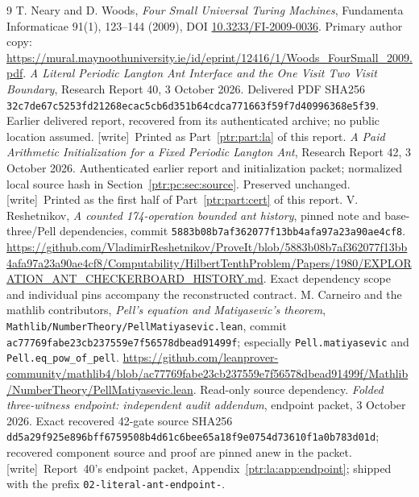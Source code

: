 \documentclass[11pt,letterpaper]{article}
\theoremstyle{definition}\newtheorem{definition}[theorem]{Definition}
\theoremstyle{remark}\newtheorem{remark}[theorem]{Remark}
\newcommand{\codeu}[1]{\nolinkurl{#1}}
\newcommand{\wtag}{\textup{[write]}}
\begin{document}
\begin{thebibliography}{9}
 T. Neary and D. Woods, \emph{Four Small Universal Turing Machines}, Fundamenta Informaticae 91(1), 123--144 (2009), DOI \href{https://doi.org/10.3233/FI-2009-0036}{10.3233/FI-2009-0036}. Primary author copy: \url{https://mural.maynoothuniversity.ie/id/eprint/12416/1/Woods_FourSmall_2009.pdf}.
 \emph{A Literal Periodic Langton Ant Interface and the One Visit Two Visit Boundary}, Research Report 40, 3 October 2026. Delivered PDF SHA256 \codeu{32c7de67c5253fd21268ecac5cb6d351b64cdca771663f59f7d40996368e5f39}. Earlier delivered report, recovered from its authenticated archive; no public location assumed. \wtag\ Printed as Part~\ref{ptr:part:la} of this report.
 \emph{A Paid Arithmetic Initialization for a Fixed Periodic Langton Ant}, Research Report 42, 3 October 2026. Authenticated earlier report and initialization packet; normalized local source hash in Section~\ref{ptr:pc:sec:source}. Preserved unchanged. \wtag\ Printed as the first half of Part~\ref{ptr:part:cert} of this report.
 V. Reshetnikov, \emph{A counted 174-operation bounded ant history}, pinned note and base-three/Pell dependencies, commit \codeu{5883b08b7af362077f13bb4afa97a23a90ae4cf8}. \url{https://github.com/VladimirReshetnikov/ProveIt/blob/5883b08b7af362077f13bb4afa97a23a90ae4cf8/Computability/HilbertTenthProblem/Papers/1980/EXPLORATION_ANT_CHECKERBOARD_HISTORY.md}. Exact dependency scope and individual pins accompany the reconstructed contract.
 M. Carneiro and the mathlib contributors, \emph{Pell's equation and Matiyasevic's theorem}, \codeu{Mathlib/NumberTheory/PellMatiyasevic.lean}, commit \codeu{ac77769fabe23cb237559e7f56578dbead91499f}; especially \codeu{Pell.matiyasevic} and \codeu{Pell.eq_pow_of_pell}. \url{https://github.com/leanprover-community/mathlib4/blob/ac77769fabe23cb237559e7f56578dbead91499f/Mathlib/NumberTheory/PellMatiyasevic.lean}. Read-only source dependency.
 \emph{Folded three-witness endpoint: independent audit addendum}, endpoint packet, 3 October 2026. Exact recovered 42-gate source SHA256 \codeu{dd5a29f925e896bff6759508b4d61c6bee65a18f9e0754d73610f1a0b783d01d}; recovered component source and proof are pinned anew in the packet. \wtag\ Report~40's endpoint packet, Appendix~\ref{ptr:la:app:endpoint}; shipped with the prefix \texttt{02-literal-ant-endpoint-}.
\end{thebibliography}
\clearpage
\end{document}
